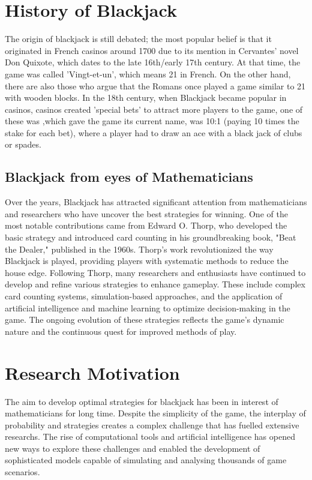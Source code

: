 \documentclass[a4paper,12pt]{report}
\begin{document}
\section{History of Blackjack} The origin of blackjack is still debated; the most popular belief is that it originated in French casinos around 1700 due to its mention in Cervantes' novel Don Quixote, which dates to the late 16th/early 17th century. At that time, the game was called 'Vingt-et-un', which means 21 in French. On the other hand, there are also those who argue that the Romans once played a game similar to 21 with wooden blocks. In the 18th century, when Blackjack became popular in casinos, casinos created 'special bets' to attract more players to the game, one of these was ,which gave the game its current name, was 10:1 (paying 10 times the stake for each bet), where a player had to draw an ace with a black jack of clubs or spades.


\subsection{Blackjack from eyes of Mathematicians} Over the years, Blackjack has attracted significant attention from mathematicians and researchers who have uncover the best strategies for winning. One of the most notable contributions came from Edward O. Thorp, who developed the basic strategy\cite{book:1} and introduced card counting in his groundbreaking book, "Beat the Dealer," published in the 1960s. Thorp's work revolutionized the way Blackjack is played, providing players with systematic methods to reduce the house edge. Following Thorp, many researchers and enthusiasts have continued to develop and refine various strategies to enhance gameplay. These include complex card counting systems, simulation-based approaches, and the application of artificial intelligence and machine learning to optimize decision-making in the game. The ongoing evolution of these strategies reflects the game's dynamic nature and the continuous quest for improved methods of play.\cite{paper:5}

\section{Research Motivation} The aim to develop optimal strategies for blackjack has been in interest of mathematicians for long time. Despite the simplicity of the game, the interplay of probability and strategies creates a complex challenge that has fuelled extensive researchs. The rise of computational tools and artificial intelligence has opened new ways to explore these challenges and enabled the development of sophisticated models capable of simulating and analysing thousands of game scenarios.
\end{document}
